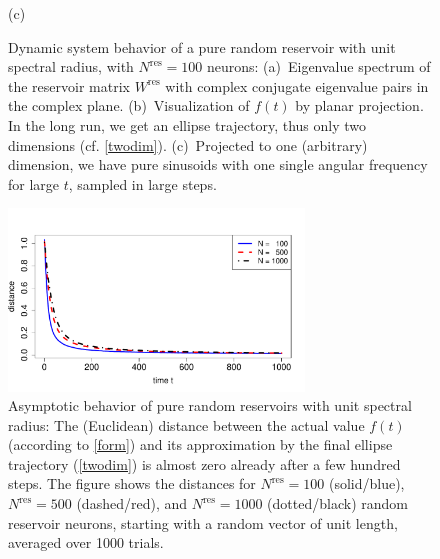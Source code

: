 \documentclass[preprint,12pt,times,authoryear]{elsarticle}%
\theoremstyle{definition}
\begin{document}
\begin{figure}
    (c) 
  \caption{Dynamic system behavior of a pure random reservoir with unit spectral
	radius, with $N^\mathrm{res} = 100$ neurons:
    (a)~Eigenvalue spectrum of the reservoir matrix $W^\mathrm{res}$ with
	complex conjugate eigenvalue pairs in the complex plane.
    (b)~Visualization of $f(t)$ by planar projection. In the long run, we get an
	ellipse trajectory, thus only two dimensions (cf. \cref{twodim}).
    (c)~Projected to one (arbitrary) dimension, we have pure sinusoids with one
	single angular frequency for large $t$, sampled in large steps.}
  \label{ell}
\end{figure}

\begin{figure}
 \centering
 \includegraphics[width=0.7\textwidth]{fig/asymptot0} %
  \caption{Asymptotic behavior of pure random reservoirs with unit spectral radius:
	The (Euclidean) distance between the actual value $f(t)$
	(according to \cref{form}) and its approximation by the final ellipse
	trajectory (\cref{twodim}) is almost zero already after a few hundred
	steps. The figure shows the distances for $N^\mathrm{res}=100$ (solid/blue), $N^\mathrm{res}=500$
	(dashed/red), and $N^\mathrm{res}=1000$ (dotted/black) random reservoir neurons,
	starting with a random vector of unit length, averaged over 1000 trials.}
  \label{asymptot}
\end{figure}
\end{document}
